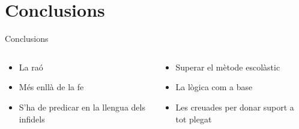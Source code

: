 \documentclass{beamer}
\begin{document}
\section{Conclusions}
\begin{frame}{Conclusions}

\begin{columns}
\begin{column}{0.4\textwidth}
\begin{itemize}
\item La raó
\item Més enllà de la fe
\item S'ha de predicar en la llengua dels infidels
\end{itemize}
\end{column}
\begin{column}{0.6\textwidth}
\begin{itemize}
\item Superar el mètode escolàstic
\item La lògica com a base
\item Les creuades per donar suport a tot plegat
\end{itemize}
\end{column}
\end{columns}

\end{frame}
\end{document}
